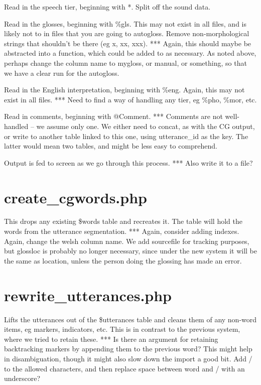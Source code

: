 \documentclass[a4paper,10pt]{article}
\begin{document}
{Read in the speech tier, beginning with *.  Split off the sound data.

Read in the glosses, beginning with \%gls.  This may not exist in all files, and is likely not to in files that you are going to autogloss.  Remove non-morphological strings that shouldn't be there (eg x, xx, xxx).
*** Again, this should maybe be abstracted into a function, which could be added to as necessary.  As noted above, perhaps change the column name to mygloss, or manual, or something, so that we have a clear run for the autogloss.

Read in the English interpretation, beginning with \%eng.  Again, this may not exist in all files.
*** Need to find a way of handling any tier, eg \%pho, \%mor, etc.   

Read in comments, beginning with @Comment.  
*** Comments are not well-handled -- we assume only one.  We either need to concat, as with the CG output, or write to another table linked to this one, using utterance\_id as the key.  The latter would mean two tables, and might be less easy to comprehend.

Output is fed to screen as we go through this process.
*** Also write it to a file?


\section{create\_cgwords.php}
\label{sec:words}

This drops any existing \$words table and recreates it.  The table will hold the words from the utterance segmentation.
*** Again, consider adding indexes.  Again, change the welsh column name.  We add sourcefile for tracking purposes, but glossloc is probably no longer necessary, since under the new system it will be the same as location, unless the person doing the glossing has made an error.


\section{rewrite\_utterances.php}
\label{sec:rewrite}

Lifts the utterances out of the \$utterances table and cleans them of any non-word items, eg markers, indicators, etc.  This is in contrast to the previous system, where we tried to retain these.
*** Is there an argument for retaining backtracking markers by appending them to the previous word?  This might help in disambiguation, though it might also slow down the import a good bit.  Add / to the allowed characters, and then replace space between word and / with an underscore?

}
\end{document}
